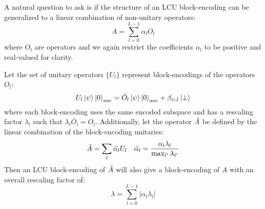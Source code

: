 A natural question to ask is if the structure of an LCU block-encoding can be generalized to a linear combination of non-unitary operators:
\begin{equation}
    \label{eq:lco}
    A = \sum_{l=0}^{L-1} \alpha_l O_l
\end{equation}
where $O_l$ are operators and we again restrict the coefficients $\alpha_l$ to be positive and real-valued for clarity.

Let the set of unitary operators $\{U_l\}$ represent block-encodings of the operators $O_l$:
\begin{equation}
    \label{eq:applying-operator}
    U_l \ket{\psi}\ket{0}_\text{anc} = \bar{O}_l \ket{\psi} \ket{0}_\text{anc} + \beta_{\psi, l} \ket{\perp}
\end{equation}
where each block-encoding uses the same encoded subspace and has a rescaling factor $\lambda_l$ such that $\lambda_l \bar{O}_l = O_l$.
Additionally, let the operator $\Tilde{A}$ be defined by the linear combination of the block-encoding unitaries:
\begin{equation}
    \Tilde{A} = \sum_{l} \Tilde{\alpha_l} U_l \hspace{1em} \Tilde{\alpha_l} = \frac{\alpha_l \lambda_l}{\max_{l^\prime}{\lambda_{l^\prime}}}
\end{equation} 
Then an LCU block-encoding of $\Tilde{A}$ will also give a block-encoding of $A$ with an overall rescaling factor of:
\begin{equation}
    \lambda = \sum_{l=0}^{L-1} |\alpha_l \lambda_l|
\end{equation}

